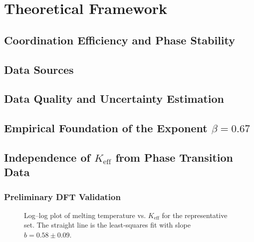 \documentclass[12pt,a4paper]{article}
\begin{document}
	\section{Theoretical Framework}
	\subsection{Coordination Efficiency and Phase Stability}
	\subsection{Data Sources}
	\subsection{Data Quality and Uncertainty Estimation}
	\subsection{Empirical Foundation of the Exponent \(\beta = 0.67\)}
	\subsection{Independence of \(K_{\mathrm{eff}}\) from Phase Transition Data}
	\subsubsection{Preliminary DFT Validation}
	
	\begin{figure}[htbp]
		\centering
		\caption{Log–log plot of melting temperature vs. \(K_{\mathrm{eff}}\) for the representative set. The straight line is the least‑squares fit with slope \(b = 0.58\pm0.09\).}
		\label{fig:tmelt_fit}
	\end{figure}
	
\end{document}
